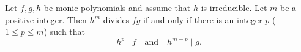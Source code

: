 Let $f, g, h$ be monic polynomials and assume that $h$ is irreducible. Let $m$ be a positive integer. Then $h^m$ divides $fg$ if and only if there is an integer $p$ ($1 \leq p \leq m$) such that
$$h^p \mid f \quad \text{and} \quad h^{m-p} \mid g.$$
